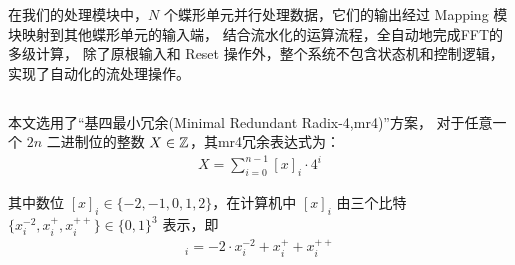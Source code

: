 在我们的处理模块中，$N$ 个蝶形单元并行处理数据，它们的输出经过 Mapping 模块映射到其他蝶形单元的输入端，
结合流水化的运算流程，全自动地完成FFT的多级计算，
除了原根输入和 Reset 操作外，整个系统不包含状态机和控制逻辑，实现了自动化的流处理操作。

\subsection{}

本文选用了``基四最小冗余(Minimal Redundant Radix-4,mr4)''方案，
对于任意一个 $2n$ 二进制位的整数 $X\in\mathbb{Z}$，其mr4冗余表达式为：
\begin{eqnarray*}
    X=\sum_{i=0}^{n-1}[x]_i\cdot 4^i
\end{eqnarray*}

其中数位 $[x]_i\in\{-2,-1,0,1,2\}$，在计算机中 $[x]_i$ 由三个比特 $\{x_i^{-2},x_i^{+},x_i^{++}\}\in\{0,1\}^3$ 表示，即
\begin{eqnarray*}
    [x]_i=-2\cdot x_i^{-2}+x_i^{+}+x_i^{++}
\end{eqnarray*}

